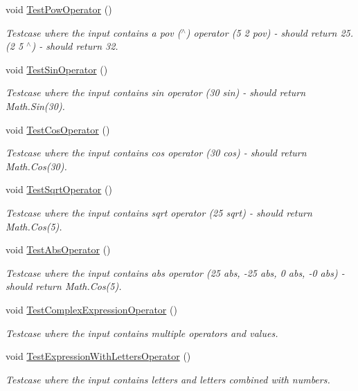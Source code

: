 \begin{DoxyCompactItemize}
void \hyperlink{class_inheritance_r_p_c___project_1_1_inheritance_r_p_ctests_aa9c399d75f02fc273e271d580286a97b}{Test\+Pow\+Operator} ()
\begin{DoxyCompactList}\small\item\em Testcase where the input contains a pov ($^\wedge$) operator (5 2 pov) -\/ should return 25. (2 5 $^\wedge$) -\/ should return 32. \end{DoxyCompactList}\item 
void \hyperlink{class_inheritance_r_p_c___project_1_1_inheritance_r_p_ctests_a89d070a8b13358f0ab48bf1182609680}{Test\+Sin\+Operator} ()
\begin{DoxyCompactList}\small\item\em Testcase where the input contains sin operator (30 sin) -\/ should return Math.\+Sin(30). \end{DoxyCompactList}\item 
void \hyperlink{class_inheritance_r_p_c___project_1_1_inheritance_r_p_ctests_ae9bb58e3c9c18e96211ccb350f1b61e6}{Test\+Cos\+Operator} ()
\begin{DoxyCompactList}\small\item\em Testcase where the input contains cos operator (30 cos) -\/ should return Math.\+Cos(30). \end{DoxyCompactList}\item 
void \hyperlink{class_inheritance_r_p_c___project_1_1_inheritance_r_p_ctests_accf0b71829cd2bf549e23f582b177442}{Test\+Sqrt\+Operator} ()
\begin{DoxyCompactList}\small\item\em Testcase where the input contains sqrt operator (25 sqrt) -\/ should return Math.\+Cos(5). \end{DoxyCompactList}\item 
void \hyperlink{class_inheritance_r_p_c___project_1_1_inheritance_r_p_ctests_a552277330403bfd1df1089e8237a1f9e}{Test\+Abs\+Operator} ()
\begin{DoxyCompactList}\small\item\em Testcase where the input contains abs operator (25 abs, -\/25 abs, 0 abs, -\/0 abs) -\/ should return Math.\+Cos(5). \end{DoxyCompactList}\item 
void \hyperlink{class_inheritance_r_p_c___project_1_1_inheritance_r_p_ctests_ae1764b34b6a1bf3a16632c54c8959e23}{Test\+Complex\+Expression\+Operator} ()
\begin{DoxyCompactList}\small\item\em Testcase where the input contains multiple operators and values. \end{DoxyCompactList}\item 
void \hyperlink{class_inheritance_r_p_c___project_1_1_inheritance_r_p_ctests_a665b3473a8437f81c30d55ae8893fe8f}{Test\+Expression\+With\+Letters\+Operator} ()
\begin{DoxyCompactList}\small\item\em Testcase where the input contains letters and letters combined with numbers. \end{DoxyCompactList}\end{DoxyCompactItemize}


